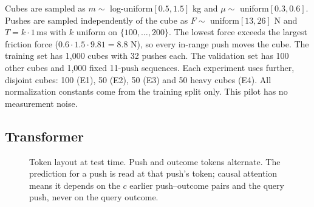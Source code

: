 \documentclass{article}
\begin{document}
Cubes are sampled as $m\sim$ log-uniform$[0.5,1.5]$ kg and $\mu\sim$ uniform$[0.3,0.6]$. Pushes are sampled independently of the cube as $F\sim$ uniform$[13,26]$ N and $T=k\cdot 1$\,ms with $k$ uniform on $\{100,\dots,200\}$. The lowest force exceeds the largest friction force ($0.6\cdot1.5\cdot9.81=8.8$ N), so every in-range push moves the cube. The training set has 1,000 cubes with 32 pushes each. The validation set has 100 other cubes and 1,000 fixed 11-push sequences. Each experiment uses further, disjoint cubes: 100 (E1), 50 (E2), 50 (E3) and 50 heavy cubes (E4). All normalization constants come from the training split only. This pilot has no measurement noise.

\subsection{Transformer}\label{sec:model}
\begin{figure}[t]
\centering
{}
\caption{Token layout at test time. Push and outcome tokens alternate. The prediction for a push is read at that push's token; causal attention means it depends on the $c$ earlier push--outcome pairs and the query push, never on the query outcome.}
\label{fig:tokens}
\end{figure}
\end{document}

